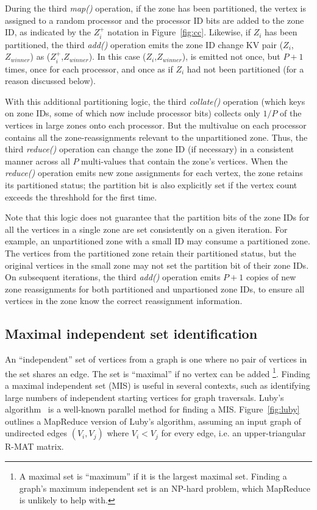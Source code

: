 During the third {\it map()} operation, if the zone has been
partitioned, the vertex is assigned to a random processor and the
processor ID bits are added to the zone ID, as indicated by the
$Z_i^+$ notation in Figure~\ref{fig:cc}.  Likewise, if $Z_i$ has been
partitioned, the third {\it add()} operation emits the zone ID change
KV pair ($Z_i$,$Z_{winner}$) as ($Z_i^+$,$Z_{winner}$).  In this case
($Z_i$,$Z_{winner}$), is emitted not once, but $P+1$ times, once for
each processor, and once as if $Z_i$ had not been partitioned (for a
reason discussed below).

With this additional partitioning logic, the third {\it collate()}
operation (which keys on zone IDs, some of which now include processor
bits) collects only $1/P$ of the vertices in large zones onto each
processor.  But the multivalue on each processor contains all the
zone-reassignments relevant to the unpartitioned zone.  Thus, the
third {\it reduce()} operation can change the zone ID (if necessary)
in a consistent manner across all $P$ multi-values that contain the
zone's vertices.  When the {\it reduce()} operation emits new zone
assignments for each vertex, the zone retains its partitioned status;
the partition bit is also explicitly set if the vertex count exceeds
the threshhold for the first time.

Note that this logic does not guarantee that the partition bits of the
zone IDs for all the vertices in a single zone are set consistently on
a given iteration.  For example, an unpartitioned zone with a small ID
may consume a partitioned zone.  The vertices from the partitioned
zone retain their partitioned status, but the original vertices in the
small zone may not set the partition bit of their zone IDs.  On
subsequent iterations, the third {\it add()} operation emits $P+1$
copies of new zone reassignments for both partitioned and unpartioned
zone IDs, to ensure all vertices in the zone know the correct
reassignment information.

\subsection{Maximal independent set identification}

An ``independent'' set of vertices from a graph is one where no pair
of vertices in the set shares an edge.  The set is ``maximal'' if no
vertex can be added \footnote{A maximal set is ``maximum'' if it is
the largest maximal set.  Finding a graph's maximum independent set is
an NP-hard problem, which MapReduce is unlikely to help with.}.
Finding a maximal independent set (MIS) is useful in several contexts,
such as identifying large numbers of independent starting vertices for
graph traversals.  Luby's algorithm~\cite{Luby86} is a well-known
parallel method for finding a MIS.  Figure~\ref{fig:luby} outlines a
MapReduce version of Luby's algorithm, assuming an input graph of
undirected edges $(V_i,V_j)$ where $V_i < V_j$ for every edge, i.e. an
upper-triangular R-MAT matrix.


